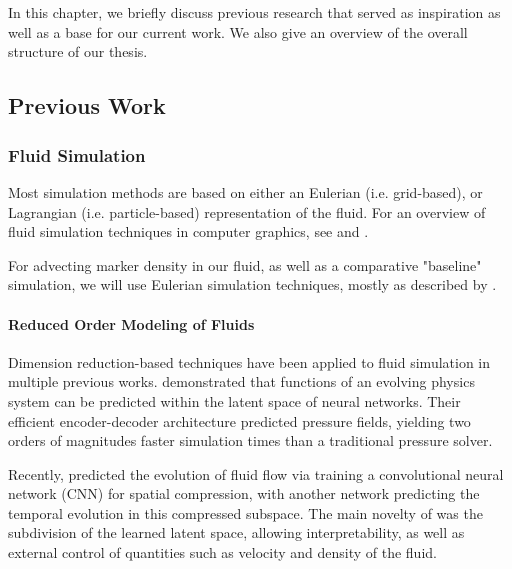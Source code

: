 \chapter{\bevezetes}

In this chapter, we briefly discuss previous research that served as inspiration
as well as a base for our current work. We also give an overview of the overall
structure of our thesis. 


\section{Previous Work}
\subsection{Fluid Simulation}
Most simulation methods are based on either an Eulerian (i.e.  grid-based), or
Lagrangian (i.e. particle-based) representation of the fluid.  For an overview
of fluid simulation techniques in computer graphics, see \cite{FluidNotes} and
\cite{BridsonFluid}. 

For advecting marker density in our fluid, as well as a comparative "baseline"
simulation, we will use Eulerian simulation techniques, mostly as described by
\cite{StableFluids}.


\subsubsection*{Reduced Order Modeling of Fluids}
Dimension reduction-based techniques have been applied to fluid simulation in
multiple previous works. \cite{Wiewel2019LatentSP} demonstrated that functions
of an evolving physics system can be predicted within the latent space of neural
networks. Their efficient encoder-decoder architecture predicted pressure
fields, yielding two orders of magnitudes faster simulation times than
a traditional pressure solver.

Recently, \cite{LatentSpaceSubdivision} predicted the
evolution of fluid flow via training a convolutional neural network (CNN) for
spatial compression, with another network predicting the temporal evolution in
this compressed subspace.  The main novelty of \cite{LatentSpaceSubdivision} was
the subdivision of the learned latent space, allowing interpretability, as well
as external control of quantities such as velocity and density of the fluid.

